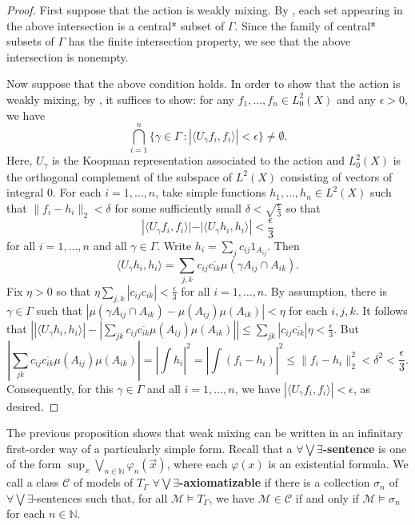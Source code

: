 \documentclass[12pt]{amsart}
\theoremstyle{definition}
\def\bb{\mathbb}
\def\bb{\mathbb}
\begin{document}
\begin{proof}
First suppose that the action is weakly mixing.  By \cite[Theorem 4.7]{bergelson}, each set appearing in the above intersection is a central* subset of $\Gamma$.  Since the family of central* subsets of $\Gamma$ has the finite intersection property, we see that the above intersection is nonempty.

Now suppose that the above condition holds.  In order to show that the action is weakly mixing, by \cite[Exercise 21]{bergelson}, it suffices to show:  for any $f_1,\ldots,f_n\in L^2_0(X)$ and any $\epsilon>0$, we have
$$\bigcap_{i=1}^n\{\gamma\in \Gamma \ : |\langle U_\gamma f_i,f_i\rangle|<\epsilon\}\not=\emptyset.$$ Here, $U_\gamma$ is the Koopman representation associated to the action and $L^2_0(X)$ is the orthogonal complement of the subspace of $L^2(X)$ consisting of vectors of integral $0$.  For each $i=1,\ldots,n$, take simple functions $h_1,\ldots,h_n\in L^2(X)$ such that $\|f_i-h_i\|_2<\delta$ for some sufficiently small $\delta<\sqrt{\frac{\epsilon}{3}}$ so that $$\left|\langle U_\gamma f_i,f_i\rangle|-|\langle U_\gamma h_i,h_i\rangle\right|<\frac{\epsilon}{3}$$ for all $i=1,\ldots,n$ and all $\gamma \in \Gamma$.  Write $h_i=\sum_{j} c_{ij}1_{A_{ij}}$.  Then
$$\langle U_\gamma h_i,h_i\rangle=\sum_{j,k}c_{ij}\overline{c_{ik}}\mu(\gamma A_{ij}\cap A_{ik}).$$ Fix $\eta>0$ so that $\eta\sum_{j,k}|c_{ij}c_{ik}|<\frac{\epsilon}{3}$ for all $i=1,\ldots,n$.  By assumption, there is $\gamma\in \Gamma$ such that $|\mu(\gamma A_{ij}\cap A_{ik})-\mu(A_{ij})\mu(A_{ik})|<\eta$ for each $i,j,k$.  It follows that $\left||\langle U_\gamma h_i,h_i\rangle|-|\sum_{jk}c_{ij}\overline{c_{ik}}\mu(A_{ij})\mu(A_{ik})|\right|\leq\sum_{jk}|c_{ij}\overline{c_{ik}}|\eta<\frac{\epsilon}{3}$. But $$\left|\sum_{jk}c_{ij}\overline{c_{ik}}\mu(A_{ij})\mu(A_{ik})\right|=\left|\int h_i\right|^2=\left|\int (f_i-h_i)\right|^2\leq \|f_i-h_i\|_2^2<\delta^2<\frac{\epsilon}{3}.$$  Consequently, for this $\gamma \in \Gamma$ and all $i=1,\ldots,n$, we have $|\langle U_\gamma f_i,f_i\rangle|<\epsilon$, as desired.
\end{proof}

The previous proposition shows that weak mixing can be written in an infinitary first-order way of a particularly simple form.  Recall that a \textbf{$\forall\bigvee\exists$-sentence} is one of the form $\sup_x\bigvee_{n\in \bb N}\varphi_n(\vec x)$, where each $\varphi(x)$ is an existential formula.  We call a class $\mathcal{C}$ of models of $T_\Gamma$ \textbf{$\forall\bigvee\exists$-axiomatizable} if there is a collection $\sigma_n$ of $\forall\bigvee\exists$-sentences such that, for all $\mathcal{M}\models T_\Gamma$, we have $\mathcal{M}\in \mathcal{C}$ if and only if $\mathcal{M}\models\sigma_n$ for each $n\in \bb N$.
\end{document}
